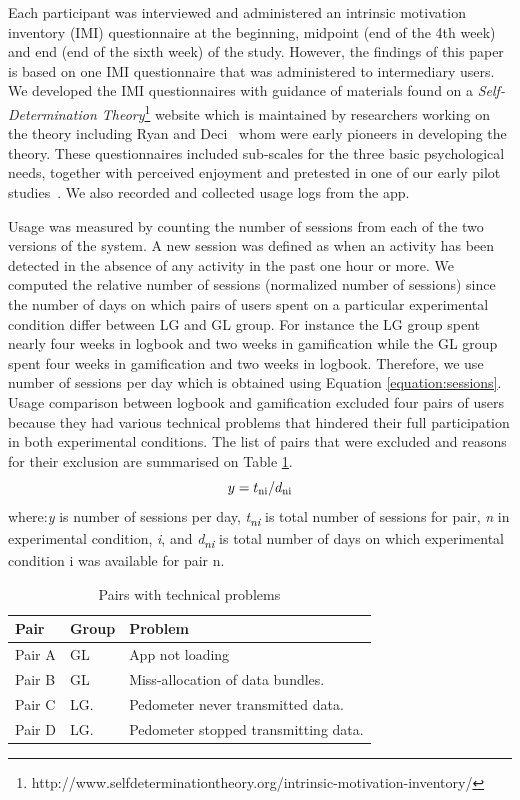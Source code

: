 \documentclass{sig-alternate}
\def\SB#1{\textsubscript{\textcolor{black}{#1}}}
\begin{document}
Each participant was interviewed and administered an intrinsic motivation inventory (IMI) questionnaire at the beginning, midpoint (end of the 4th week) and end (end of the sixth week) of the study. However, the findings of this paper is based on one IMI questionnaire that was administered to intermediary users. We developed the IMI questionnaires with guidance of materials found on a \emph{Self-Determination Theory}\footnote{http://www.selfdeterminationtheory.org/intrinsic-motivation-inventory/} website which is maintained by researchers working on the theory including Ryan and Deci~\cite{deci1985:intrinsic} whom were early pioneers in developing the theory. These questionnaires included sub-scales for the three basic psychological needs, together with perceived enjoyment and pretested in one of our early pilot studies~\cite{katule2016:leveraging}.  We also recorded and collected usage logs from the app.

Usage was measured by counting the number of sessions from each of the two versions of the system. A new session was defined as when an activity has been detected in the absence of any activity in the past one hour or more. We computed the relative number of sessions (normalized number of sessions) since the number of days on which pairs of users spent on a particular experimental condition differ between LG and GL group. For instance the LG group spent nearly four weeks in logbook and two weeks in gamification while the GL group spent four weeks in gamification and two weeks in logbook. Therefore, we use number of sessions per day which is obtained using Equation \ref{equation:sessions}. Usage comparison between logbook and gamification excluded four pairs of users because they had various technical problems that hindered their full participation in both experimental conditions. The list of pairs that were excluded and reasons for their exclusion are summarised on Table \ref{table:usageproblems}.
\begin{equation}
\label{equation:sessions}
y=t\SB{ni}/d\SB{ni}
\end{equation}
where:\emph{y} is number of sessions per day, \emph{t\SB{ni}} is total number of sessions for pair, \emph{n} in experimental condition, \emph{i}, and \emph{d\SB{ni}} is total number of days on which experimental condition i was available for pair n.
\begin{table}%
  \begin{center}
    \caption{Pairs with technical problems}
    \label{table:usageproblems}
	\begin{tabular}{|p{0.95cm}|p{0.75cm}|p{5.4cm}|}
		\hline
		Pair&Group&Problem\\
		\hline
		Pair A&GL &App not loading\\
		\hline
		Pair B&GL& Miss-allocation of data bundles.\\
		\hline
		Pair C & LG.& Pedometer never transmitted data.\\
		\hline
		Pair D & LG.& Pedometer stopped transmitting data.\\
	\hline
	\end{tabular}
  \end{center}
\end{table}
\end{document}
